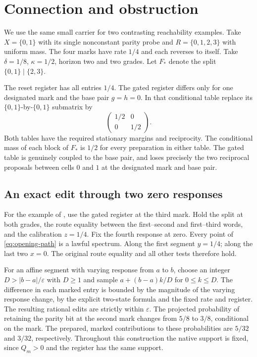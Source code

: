 \section{Connection and obstruction}\label{sec:two-examples}

We use the same small carrier for two contrasting reachability
examples. Take \(X=\{0,1\}\) with its single
nonconstant parity probe and \(R=\{0,1,2,3\}\) with uniform mass.
The four marks have rate \(1/4\) and each reverses to itself.
Take \(\delta=1/8\), \(\kappa=1/2\), horizon two and two grades.
Let \(F_*\) denote the split \(\{0,1\}\mid\{2,3\}\).

The reset register has all entries \(1/4\). The gated register differs
only for one designated mark and the base pair \(g=h=0\). In that
conditional table replace its \(\{0,1\}\)-by-\(\{0,1\}\) submatrix by
\[
 \begin{pmatrix} 1/2 & 0\\ 0&1/2\end{pmatrix}.
\]
Both tables have the required stationary margins and reciprocity.
The conditional mass of each block of \(F_*\) is \(1/2\) for every
preparation in either table. The gated table is genuinely coupled to
the base pair, and loses precisely the two reciprocal proposals
between cells \(0\) and \(1\) at the designated mark and base pair.

\subsection{An exact edit through two zero responses}\label{sec:staged}

For the example of , use the gated register
at the third mark. Hold the split at both grades, the route equality
between the first--second and first--third words, and the calibration
\(z=1/4\). Fix the fourth response at zero. Every point of
\eqref{eq:opening-path} is a lawful spectrum. Along the first segment
\(y=1/4\); along the last two \(x=0\).
The original route equality and all other tests therefore hold.

For an affine segment with varying response from \(a\) to \(b\),
choose an integer \(D>|b-a|/\varepsilon\) with \(D\ge1\) and sample
\(a+(b-a)k/D\) for \(0\le k\le D\). The difference in each marked
entry is bounded by the magnitude of the varying response change,
by the explicit two-state formula and the fixed rate and register.
The resulting rational edits are strictly within \(\varepsilon\).
The projected probability of retaining the parity bit at the
second mark changes from \(5/8\) to \(3/8\), conditional on the mark.
The prepared, marked contributions to these probabilities are
\(5/32\) and \(3/32\), respectively.
Throughout this construction the native support is fixed, since
\(Q_m>0\) and the register has the same support.


